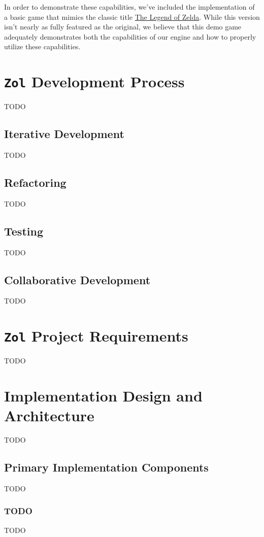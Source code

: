 \documentclass{article}
\newcommand{\projectname}[0] {\texttt{Zol} }
\newcommand{\hrefloz}[0] {\href{http://en.wikipedia.org/wiki/The\_ Legend\_ of\_ Zelda\_ (video\_ game)}{The Legend of Zelda}}
\begin{document}
	In order to demonstrate these capabilities, we've included the implementation
	of a basic game that mimics the classic title \hrefloz.  While this version
	isn't nearly as fully featured as the original, we believe that this demo game
	adequately demonstrates both the capabilities of our engine and how to properly
	utilize these capabilities.

	\section[Development]{\projectname Development Process}
	TODO

		\subsection{Iterative Development}
		TODO

		\subsection{Refactoring}
		TODO

		\subsection{Testing}
		TODO

		\subsection{Collaborative Development}
		TODO

	\section[Requirements]{\projectname Project Requirements}
	TODO

	\section[Architecture and Design]{Implementation Design and Architecture}
	TODO

		\subsection[Primary Components]{Primary Implementation Components}
		TODO

			\subsubsection{TODO}
			TODO
\end{document}
